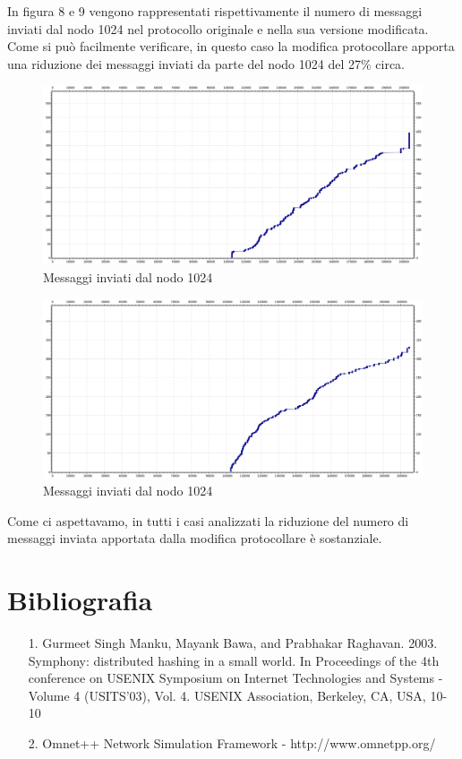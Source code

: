 \documentclass[	
	DIV=calc,
	paper=a4,
	fontsize=11pt,
	onecolumn
]{scrartcl} %
\begin{document}
In figura 8 e 9 vengono rappresentati rispettivamente il numero di messaggi inviati dal nodo 1024 nel protocollo originale e nella sua versione modificata. Come si può facilmente verificare, in questo caso la modifica protocollare apporta una riduzione dei messaggi inviati da parte del nodo 1024 del 27\% circa.

\begin{figure}
	\centering
	\includegraphics[scale=0.35]{TwoThousandNodesNode1024.png}
	\caption{Messaggi inviati dal nodo 1024}
	\label{Figura 8}
\end{figure}

\begin{figure}
	\centering
	\includegraphics[scale=0.35]{TwoThousandNodesNode1024Mod.png}
	\caption{Messaggi inviati dal nodo 1024}
	\label{Figura 9}
\end{figure}

Come ci aspettavamo, in tutti i casi analizzati la riduzione del numero di messaggi inviata apportata dalla modifica protocollare è sostanziale. 
\section{Bibliografia}
\begin{itemize}
\item[1.] Gurmeet Singh Manku, Mayank Bawa, and Prabhakar Raghavan. 2003. Symphony: distributed
hashing in a small world. In Proceedings of the 4th conference on USENIX Symposium on
Internet Technologies and Systems - Volume 4 (USITS'03), Vol. 4. USENIX Association,
Berkeley, CA, USA, 10-10
\item[2.] Omnet++ Network Simulation Framework - http://www.omnetpp.org/ 
\end{itemize}
\end{document}
